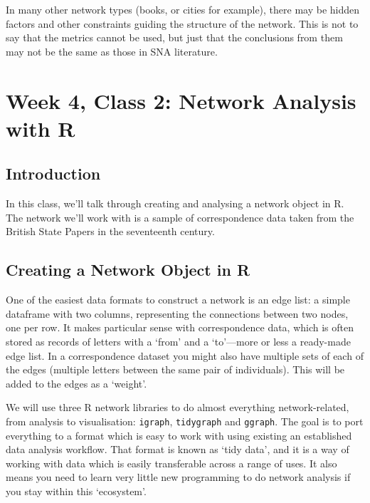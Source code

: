 \documentclass[
]{book}
\begin{document}
In many other network types (books, or cities for example), there may be hidden factors and other constraints guiding the structure of the network. This is not to say that the metrics cannot be used, but just that the conclusions from them may not be the same as those in SNA literature.

\hypertarget{week-4-class-2-network-analysis-with-r}{%
\chapter{Week 4, Class 2: Network Analysis with R}\label{week-4-class-2-network-analysis-with-r}}

\hypertarget{introduction-2}{%
\section{Introduction}\label{introduction-2}}

In this class, we'll talk through creating and analysing a network object in R. The network we'll work with is a sample of correspondence data taken from the British State Papers in the seventeenth century.

\hypertarget{creating-a-network-object-in-r}{%
\section{Creating a Network Object in R}\label{creating-a-network-object-in-r}}

One of the easiest data formats to construct a network is an edge list: a simple dataframe with two columns, representing the connections between two nodes, one per row. It makes particular sense with correspondence data, which is often stored as records of letters with a `from' and a `to'---more or less a ready-made edge list. In a correspondence dataset you might also have multiple sets of each of the edges (multiple letters between the same pair of individuals). This will be added to the edges as a `weight'.

We will use three R network libraries to do almost everything network-related, from analysis to visualisation: \texttt{igraph}, \texttt{tidygraph} and \texttt{ggraph}. The goal is to port everything to a format which is easy to work with using existing an established data analysis workflow. That format is known as `tidy data', and it is a way of working with data which is easily transferable across a range of uses. It also means you need to learn very little new programming to do network analysis if you stay within this `ecosystem'.
\end{document}
